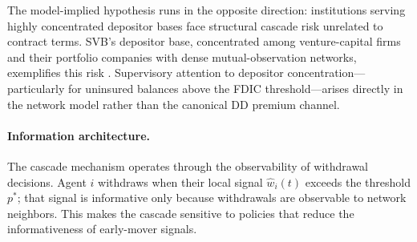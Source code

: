 \documentclass[12pt]{article}\usepackage[]{graphicx}\usepackage[]{xcolor}
\begin{document}
The model-implied hypothesis runs in the opposite direction: institutions serving highly concentrated depositor bases face structural cascade risk unrelated to contract terms.
SVB's depositor base, concentrated among venture-capital firms and their portfolio companies with dense mutual-observation networks, exemplifies this risk \citep{cookson2023social}.
Supervisory attention to depositor concentration---particularly for uninsured balances above the FDIC threshold---arises directly in the network model rather than the canonical DD premium channel.

\paragraph{Information architecture.}
The cascade mechanism operates through the observability of withdrawal decisions.
Agent $i$ withdraws when their local signal $\hat{w}_i(t)$ exceeds the threshold $p^*$; that signal is informative only because withdrawals are observable to network neighbors.
This makes the cascade sensitive to policies that reduce the informativeness of early-mover signals.
\end{document}
